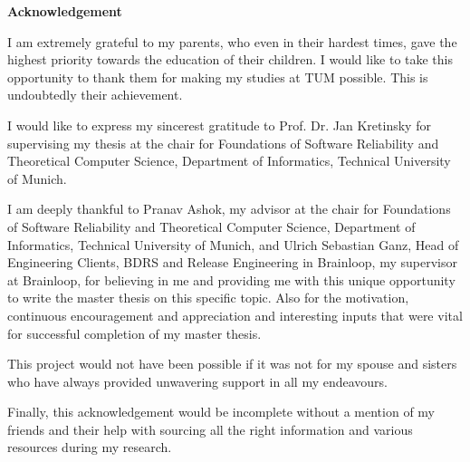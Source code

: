 
\newpage
{}
\thispagestyle{empty}
\hoffset=0mm
\begin{center}
    {\Large \bf Acknowledgement}
\end{center}

\vspace{1cm}

I am extremely grateful to my parents, who even in their hardest times, gave the highest priority towards the education of their children. I would like to take this opportunity to thank them for making my studies at TUM possible. This is undoubtedly their achievement.

I would like to express my sincerest gratitude to Prof. Dr. Jan Kretinsky for supervising my thesis at the chair for Foundations of Software Reliability and Theoretical Computer Science, Department of Informatics, Technical University of Munich. 

I am deeply thankful to Pranav Ashok, my advisor at the chair for Foundations of Software Reliability and Theoretical Computer Science, Department of Informatics, Technical University of Munich, and Ulrich Sebastian Ganz, Head of Engineering Clients, BDRS and Release Engineering in Brainloop, my supervisor at Brainloop, for believing in me and providing me with this unique opportunity to write the master thesis on this specific topic. Also for the motivation, continuous encouragement and appreciation and interesting inputs that were vital for successful completion of my master thesis.

This project would not have been possible if it was not for my spouse and sisters who have always provided unwavering support in all my endeavours.

Finally, this acknowledgement would be incomplete without a mention of my friends and their help with sourcing all the right information and various resources during my research.

